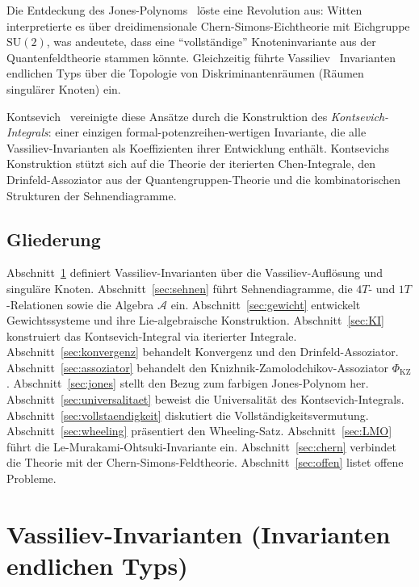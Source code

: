 \documentclass[12pt,a4paper]{amsart}
\theoremstyle{definition}
\newcommand{\Ac}{\mathcal{A}}
\begin{document}
Die Entdeckung des Jones-Polynoms~\cite{jones1985} löste eine Revolution aus:
Witten~\cite{witten1989} interpretierte es über dreidimensionale
Chern-Simons-Eichtheorie mit Eichgruppe $\mathrm{SU}(2)$, was andeutete,
dass eine ``vollständige'' Knoteninvariante aus der Quantenfeldtheorie stammen
könnte.  Gleichzeitig führte Vassiliev~\cite{vassiliev1990} Invarianten
endlichen Typs über die Topologie von Diskriminantenräumen (Räumen singulärer
Knoten) ein.

Kontsevich~\cite{kontsevich1993} vereinigte diese Ansätze durch die Konstruktion
des \emph{Kontsevich-Integrals}: einer einzigen formal-potenzreihen-wertigen
Invariante, die alle Vassiliev-Invarianten als Koeffizienten ihrer Entwicklung
enthält.  Kontsevichs Konstruktion stützt sich auf die Theorie der iterierten
Chen-Integrale, den Drinfeld-Assoziator aus der Quantengruppen-Theorie und
die kombinatorischen Strukturen der Sehnendiagramme.

\subsection*{Gliederung}

Abschnitt~\ref{sec:vassiliev} definiert Vassiliev-Invarianten über die
Vassiliev-Auflösung und singuläre Knoten.
Abschnitt~\ref{sec:sehnen} führt Sehnendiagramme, die $4T$- und $1T$-Relationen
sowie die Algebra $\Ac$ ein.
Abschnitt~\ref{sec:gewicht} entwickelt Gewichtssysteme und ihre Lie-algebraische
Konstruktion.
Abschnitt~\ref{sec:KI} konstruiert das Kontsevich-Integral via iterierter Integrale.
Abschnitt~\ref{sec:konvergenz} behandelt Konvergenz und den Drinfeld-Assoziator.
Abschnitt~\ref{sec:assoziator} behandelt den Knizhnik-Zamolodchikov-Assoziator
$\Phi_{\mathrm{KZ}}$.
Abschnitt~\ref{sec:jones} stellt den Bezug zum farbigen Jones-Polynom her.
Abschnitt~\ref{sec:universalitaet} beweist die Universalität des Kontsevich-Integrals.
Abschnitt~\ref{sec:vollstaendigkeit} diskutiert die Vollständigkeitsvermutung.
Abschnitt~\ref{sec:wheeling} präsentiert den Wheeling-Satz.
Abschnitt~\ref{sec:LMO} führt die Le-Murakami-Ohtsuki-Invariante ein.
Abschnitt~\ref{sec:chern} verbindet die Theorie mit der Chern-Simons-Feldtheorie.
Abschnitt~\ref{sec:offen} listet offene Probleme.

\section{Vassiliev-Invarianten (Invarianten endlichen Typs)}\label{sec:vassiliev}
\end{document}

